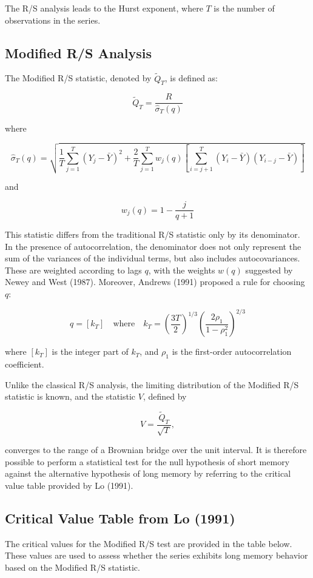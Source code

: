 \documentclass[11pt]{extarticle}
\begin{document}
The R/S analysis leads to the Hurst exponent, where $T$ is the number of observations in the series.

\subsection{Modified R/S Analysis}
The Modified R/S statistic, denoted by $\tilde{Q}_T$, is defined as:

\[
\tilde{Q}_T = \frac{R}{\hat{\sigma}_T(q)}
\]

where

\[
\hat{\sigma}_T(q) = \sqrt{\frac{1}{T} \sum_{j=1}^{T} (Y_j - \bar{Y})^2 + \frac{2}{T} \sum_{j=1}^{T} w_j(q) \left[ \sum_{i=j+1}^{T} (Y_i - \bar{Y})(Y_{i-j} - \bar{Y}) \right]}
\]

and

\[
w_j(q) = 1 - \frac{j}{q + 1}
\]

This statistic differs from the traditional R/S statistic only by its denominator. In the presence of autocorrelation, the denominator does not only represent the sum of the variances of the individual terms, but also includes autocovariances.
These are weighted according to lags $q$, with the weights $w(q)$ suggested by Newey and West (1987). Moreover, Andrews (1991) proposed a rule for choosing $q$:

\[
q = \left[ k_T \right] \quad \text{where} \quad k_T = \left( \frac{3T}{2} \right)^{1/3} \left( \frac{2 \rho_1}{1 - \rho_1^2} \right)^{2/3}
\]

where $[k_T]$ is the integer part of $k_T$, and $\rho_1$ is the first-order autocorrelation coefficient.

Unlike the classical R/S analysis, the limiting distribution of the Modified R/S statistic is known, and the statistic $V$, defined by

\[
V = \frac{\tilde{Q}_T}{\sqrt{T}},
\]

converges to the range of a Brownian bridge over the unit interval. It is therefore possible to perform a statistical test for the null hypothesis of short memory against the alternative hypothesis of long memory by referring to the critical value table provided by Lo (1991).

\subsection{Critical Value Table from Lo (1991)}
The critical values for the Modified R/S test are provided in the table below. These values are used to assess whether the series exhibits long memory behavior based on the Modified R/S statistic.
\end{document}
